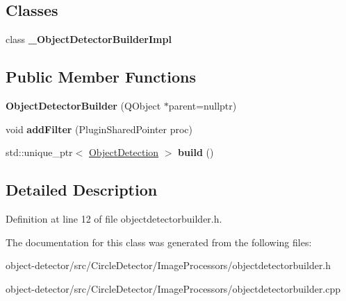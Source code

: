 \subsection*{Classes}
\begin{DoxyCompactItemize}
\item 
class {\bfseries \+\_\+\+Object\+Detector\+Builder\+Impl}
\end{DoxyCompactItemize}
\subsection*{Public Member Functions}
\begin{DoxyCompactItemize}
\item 
\mbox{\label{class_image_processor_1_1_object_detector_builder_ab7cb398190f337717c7d5f33cdbaac9d}} 
{\bfseries Object\+Detector\+Builder} (Q\+Object $\ast$parent=nullptr)
\item 
\mbox{\label{class_image_processor_1_1_object_detector_builder_aae33598df7e3eac6acc72f10eb1c683d}} 
void {\bfseries add\+Filter} (Plugin\+Shared\+Pointer proc)
\item 
\mbox{\label{class_image_processor_1_1_object_detector_builder_ae920399f7c9b72b6a629efec595497e2}} 
std\+::unique\+\_\+ptr$<$ \hyperlink{class_image_processor_1_1_object_detection}{Object\+Detection} $>$ {\bfseries build} ()
\end{DoxyCompactItemize}


\subsection{Detailed Description}


Definition at line 12 of file objectdetectorbuilder.\+h.



The documentation for this class was generated from the following files\+:\begin{DoxyCompactItemize}
\item 
object-\/detector/src/\+Circle\+Detector/\+Image\+Processors/objectdetectorbuilder.\+h\item 
object-\/detector/src/\+Circle\+Detector/\+Image\+Processors/objectdetectorbuilder.\+cpp\end{DoxyCompactItemize}
